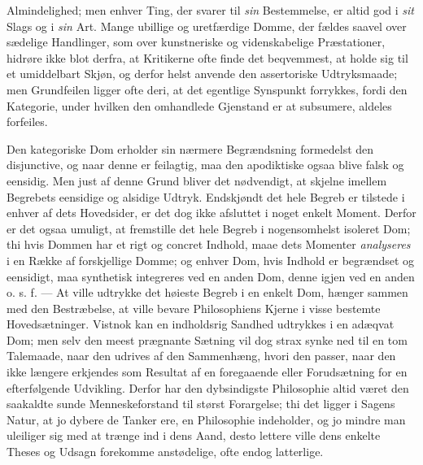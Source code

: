 \documentclass[12pt]{book}
\newcommand{\opage}[1]{\marginnote{\footnotesize\textit{[#1]}}}
\begin{document}
Almindelighed; men enhver Ting, der svarer til \emph{sin} Bestemmelse, er altid
god i \emph{sit} Slags og i \emph{sin} Art. Mange ubillige og uretfærdige Domme,
der fældes saavel over sædelige Handlinger, som over kunstneriske og
videnskabelige Præstationer, hidrøre ikke blot derfra, at Kritikerne ofte finde
det beqvemmest, at holde sig til et umiddelbart Skjøn, og derfor helst anvende den
assertoriske Udtryksmaade; men Grundfeilen ligger ofte deri, at det egentlige
Synspunkt forrykkes, fordi den Kategorie, under hvilken den omhandlede Gjenstand
er at subsumere, aldeles forfeiles.

Den kategoriske Dom erholder sin nærmere Begrændsning formedelst den disjunctive,
og naar denne er feilagtig, maa den apodiktiske ogsaa blive falsk og eensidig. Men
just af denne Grund bliver det nødvendigt, at skjelne imellem Begrebets eensidige
\opage{62} og alsidige Udtryk. Endskjøndt det hele Begreb er tilstede i enhver af dets
Hovedsider, er det dog ikke afsluttet i noget enkelt Moment. Derfor er det ogsaa
umuligt, at fremstille det hele Begreb i nogensomhelst isoleret Dom; thi hvis
Dommen har et rigt og concret Indhold, maae dets Momenter \emph{analyseres} i en
Række af forskjellige Domme; og enhver Dom, hvis Indhold er begrændset og
eensidigt, maa synthetisk integreres ved en anden Dom, denne igjen ved en anden
o. s. f. --- At ville udtrykke det høieste Begreb i en enkelt Dom, hænger sammen
med den Bestræbelse, at ville bevare Philosophiens Kjerne i visse bestemte
Hovedsætninger. Vistnok kan en indholdsrig Sandhed udtrykkes i en adæqvat Dom; men
selv den meest prægnante Sætning vil dog strax synke ned til en tom Talemaade,
naar den udrives af den Sammenhæng, hvori den passer, naar den ikke længere
erkjendes som Resultat af en foregaaende eller Forudsætning for en efterfølgende
Udvikling. Derfor har den dybsindigste Philosophie altid været den saakaldte sunde
Menneskeforstand til størst Forargelse; thi det ligger i Sagens Natur, at jo dybere
de Tanker ere, en Philosophie indeholder, og jo mindre man uleiliger sig med at
trænge ind i dens Aand, desto lettere ville dens enkelte Theses og Udsagn
forekomme anstødelige, ofte endog latterlige.
\end{document}
